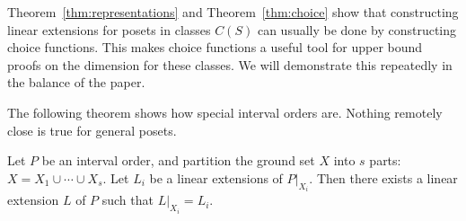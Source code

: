 Theorem~\ref{thm:representations} and Theorem~\ref{thm:choice} show that constructing linear extensions for posets in classes $C(S)$ can usually be done by constructing choice functions. This makes choice functions a useful tool for upper bound proofs on the dimension for these classes. We will demonstrate this repeatedly in the balance of the paper.

The following theorem shows how special interval orders are. Nothing remotely close is true for general posets.

\begin{theorem}\label{thm:partition}
Let $P$ be an interval order, and partition the ground set $X$ into $s$ parts: $X=X_1\cup\cdots\cup X_s$. Let $L_i$ be a linear extensions of $P|_{X_i}$. Then there exists a linear extension $L$ of $P$ such that $L|_{X_i}=L_i$.
\end{theorem}

